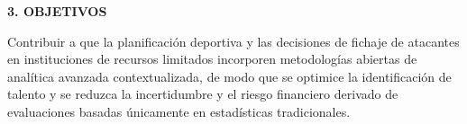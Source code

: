 \hypertarget{sec:objetivos}{}%
\begin{center}
    {\Large\bfseries 3. OBJETIVOS}
\end{center}
\vspace{1em}

\par\vspace{0.5em}
Contribuir a que la planificación deportiva y las decisiones de fichaje de atacantes en instituciones de recursos limitados incorporen metodologías abiertas de analítica avanzada contextualizada, de modo que se optimice la identificación de talento y se reduzca la incertidumbre y el riesgo financiero derivado de evaluaciones basadas únicamente en estadísticas tradicionales.

\vspace{1em}
\par\vspace{0.5em}
